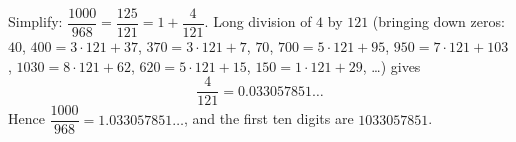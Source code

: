 Simplify: $\dfrac{1000}{968}=\dfrac{125}{121}=1+\dfrac{4}{121}$. Long division of $4$ by $121$ (bringing down zeros: $40$, $400=3\cdot121+37$, $370=3\cdot121+7$, $70$, $700=5\cdot121+95$, $950=7\cdot121+103$, $1030=8\cdot121+62$, $620=5\cdot121+15$, $150=1\cdot121+29$, \dots) gives
\[\dfrac{4}{121}=0.033057851\ldots\]
Hence $\dfrac{1000}{968}=1.033057851\ldots$, and the first ten digits are $\boxed{1033057851}$.
